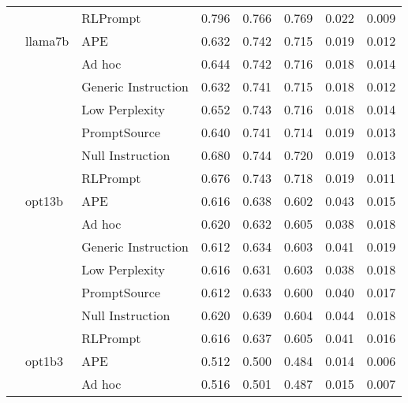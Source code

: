 \begin{supertabular}{lllrrrrr}
              &        & RLPrompt &            0.796 &           0.766 &          0.769 &        0.022 &    0.009 \\
              & llama7b & APE &            0.632 &           0.742 &          0.715 &        0.019 &    0.012 \\
              &        & Ad hoc &            0.644 &           0.742 &          0.716 &        0.018 &    0.014 \\
              &        & Generic Instruction &            0.632 &           0.741 &          0.715 &        0.018 &    0.012 \\
              &        & Low Perplexity &            0.652 &           0.743 &          0.716 &        0.018 &    0.014 \\
              &        & PromptSource &            0.640 &           0.741 &          0.714 &        0.019 &    0.013 \\
              &        & Null Instruction &            0.680 &           0.744 &          0.720 &        0.019 &    0.013 \\
              &        & RLPrompt &            0.676 &           0.743 &          0.718 &        0.019 &    0.011 \\
              & opt13b & APE &            0.616 &           0.638 &          0.602 &        0.043 &    0.015 \\
              &        & Ad hoc &            0.620 &           0.632 &          0.605 &        0.038 &    0.018 \\
              &        & Generic Instruction &            0.612 &           0.634 &          0.603 &        0.041 &    0.019 \\
              &        & Low Perplexity &            0.616 &           0.631 &          0.603 &        0.038 &    0.018 \\
              &        & PromptSource &            0.612 &           0.633 &          0.600 &        0.040 &    0.017 \\
              &        & Null Instruction &            0.620 &           0.639 &          0.604 &        0.044 &    0.018 \\
              &        & RLPrompt &            0.616 &           0.637 &          0.605 &        0.041 &    0.016 \\
              & opt1b3 & APE &            0.512 &           0.500 &          0.484 &        0.014 &    0.006 \\
              &        & Ad hoc &            0.516 &           0.501 &          0.487 &        0.015 &    0.007 \\

\end{supertabular}
